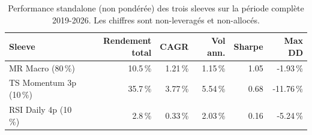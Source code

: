 \begin{table}[H]
\centering
\caption{Performance standalone (non pondérée) des trois sleeves sur la période complète 2019-2026. Les chiffres sont non-leveragés et non-allocés.}
\label{tab:sleeve_standalone}
\begin{tabular}{lrrrrr}
\toprule
Sleeve & Rendement total & CAGR & Vol ann. & Sharpe & Max DD \\
\midrule
MR Macro (80\,\%) & 10.5\,\% & 1.21\,\% & 1.15\,\% & 1.05 & -1.93\,\% \\
TS Momentum 3p (10\,\%) & 35.7\,\% & 3.77\,\% & 5.54\,\% & 0.68 & -11.76\,\% \\
RSI Daily 4p (10\,\%) & 2.8\,\% & 0.33\,\% & 2.03\,\% & 0.16 & -5.24\,\% \\
\bottomrule
\end{tabular}
\end{table}
